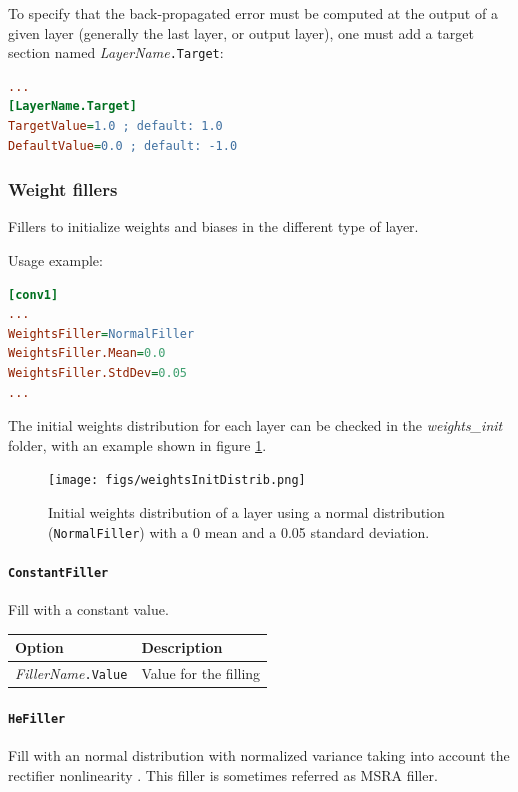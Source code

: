\documentclass[a4paper,11pt,oneside]{article}
\begin{document}
To specify that the back-propagated error must be computed at the output of a
given layer (generally the last layer, or output layer), one must add a target
section named \emph{LayerName}\lstinline!.Target!:
\begin{lstlisting}[language=ini]
...
[LayerName.Target]
TargetValue=1.0 ; default: 1.0
DefaultValue=0.0 ; default: -1.0
\end{lstlisting}


\subsubsection{Weight fillers}
Fillers to initialize weights and biases in the different type of layer.

Usage example:
\begin{lstlisting}[language=ini]
[conv1]
...
WeightsFiller=NormalFiller
WeightsFiller.Mean=0.0
WeightsFiller.StdDev=0.05
...
\end{lstlisting}

The initial weights distribution for each layer can be checked in the
 \emph{weights\_init} folder, with an example shown in figure
 \ref{fig:weightsInitDistrib}.

\begin{figure}[!htb]
  \centering
  \texttt{[image: figs/weightsInitDistrib.png]}
  \caption{Initial weights distribution of a layer using a normal distribution
  (\lstinline!NormalFiller!) with a 0 mean and a 0.05 standard deviation.}
  \label{fig:weightsInitDistrib}
\end{figure}


\paragraph{\texorpdfstring{%
\lstinline[basicstyle=\ttfamily\bfseries]!ConstantFiller!}{ConstantFiller}}
Fill with a constant value.

\begin{center}
 \begin{tabular}{| p{5cm} | p{10cm} | }
 \hline
 Option & Description\\
 \hline\hline
  \cellcolor{requiredcolor}\emph{FillerName}\lstinline!.Value! & Value for the
  filling \\
 \hline
\end{tabular}
\end{center}


\paragraph{\label{par:HeFiller}\texorpdfstring{%
\lstinline[basicstyle=\ttfamily\bfseries]!HeFiller!}{HeFiller}}
Fill with an normal distribution with normalized variance taking into account
the rectifier nonlinearity \citep{He2015}.
This filler is sometimes referred as MSRA filler.
\end{document}
